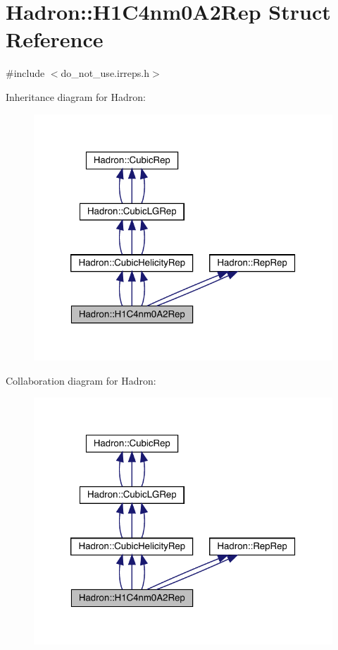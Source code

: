 \hypertarget{structHadron_1_1H1C4nm0A2Rep}{}\section{Hadron\+:\+:H1\+C4nm0\+A2\+Rep Struct Reference}
\label{structHadron_1_1H1C4nm0A2Rep}


{\ttfamily \#include $<$do\+\_\+not\+\_\+use.\+irreps.\+h$>$}



Inheritance diagram for Hadron\+:
\nopagebreak
\begin{figure}[H]
\begin{center}
\leavevmode
\includegraphics[width=320pt]{d0/d1e/structHadron_1_1H1C4nm0A2Rep__inherit__graph}
\end{center}
\end{figure}


Collaboration diagram for Hadron\+:
\nopagebreak
\begin{figure}[H]
\begin{center}
\leavevmode
\includegraphics[width=320pt]{da/db7/structHadron_1_1H1C4nm0A2Rep__coll__graph}
\end{center}
\end{figure}
